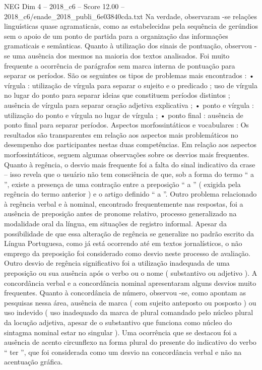 \begin{textsample}{NEG Dim 4 – 2018\_c6 – Score 12.00 – 2018\_c6/enade\_2018\_publi\_6e03840cda.txt}
Na verdade, observaram -se relações linguísticas quase agramaticais, como as estabelecidas pela sequência de gerúndios sem o apoio de um ponto de partida para a organização das informações gramaticais e semânticas.
Quanto à utilização dos sinais de pontuação, observou -se uma ausência dos mesmos na maioria dos textos analisados.
Foi muito frequente a ocorrência de parágrafos sem marca interna de pontuação para separar os períodos.
São os seguintes os tipos de problemas mais encontrados : • vírgula : utilização de vírgula para separar o sujeito e o predicado ; uso de vírgula no lugar do ponto para separar ideias que constituem períodos distintos ; ausência de vírgula para separar oração adjetiva explicativa ; • ponto e vírgula : utilização do ponto e vírgula no lugar de vírgula ; • ponto final : ausência de ponto final para separar períodos.
Aspectos morfossintáticos e vocabulares : Os resultados são transparentes em relação aos aspectos mais problemáticos no desempenho dos participantes nestas duas competências.
Em relação aos aspectos morfossintáticos, seguem algumas observações sobre os desvios mais frequentes.
Quanto à regência, o desvio mais frequente foi a falta do sinal indicativo da crase – isso revela que o usuário não tem consciência de que, sob a forma do termo “ a ”, existe a presença de uma contração entre a preposição “ a ” ( exigida pela regência do termo anterior ) e o artigo definido “ a ”.
Outro problema relacionado à regência verbal e à nominal, encontrado frequentemente nas respostas, foi a ausência de preposição antes de pronome relativo, processo generalizado na modalidade oral da língua, em situações de registro informal.
Apesar da possibilidade de que essa alteração de regência se generalize no padrão escrito da Língua Portuguesa, como já está ocorrendo até em textos jornalísticos, o não emprego da preposição foi considerado como desvio neste processo de avaliação.
Outro desvio de regência significativo foi a utilização inadequada de uma preposição ou sua ausência após o verbo ou o nome ( substantivo ou adjetivo ).
A concordância verbal e a concordância nominal apresentaram alguns desvios muito frequentes.
Quanto à concordância de número, observou -se, como apontam as pesquisas nessa área, ausência de marca ( com sujeito anteposto ou posposto ) ou uso indevido ( uso inadequado da marca de plural comandado pelo núcleo plural da locução adjetiva, apesar de o substantivo que funciona como núcleo do sintagma nominal estar no singular ).
Uma ocorrência que se destacou foi a ausência de acento circunflexo na forma plural do presente do indicativo do verbo “ ter ”, que foi considerada como um desvio na concordância verbal e não na acentuação gráfica.

\end{textsample}
